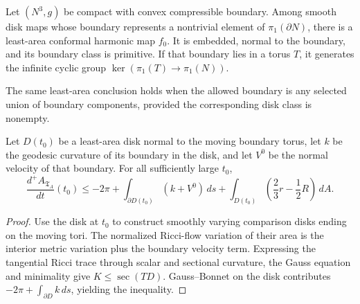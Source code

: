 \begin{theorem}
\label{thm:chow-iv-meeks-yau}
Let \((N^3,g)\) be compact with convex compressible boundary.  Among smooth
disk maps whose boundary represents a nontrivial element of
\(\pi_1(\partial N)\), there is a least-area conformal harmonic map \(f_0\).
It is embedded, normal to the boundary, and its boundary class is primitive.
If that boundary lies in a torus \(T\), it generates the infinite cyclic group
\(\ker(\pi_1(T)\to\pi_1(N))\).
\end{theorem}

\begin{remark}
\label{rem:chow-iv-relative-meeks-yau}
The same least-area conclusion holds when the allowed boundary is any selected
union of boundary components, provided the corresponding disk class is
nonempty.
\end{remark}

\begin{lemma}
\label{lem:chow-iv-minimizing-disk-first-variation}
Let \(D(t_0)\) be a least-area disk normal to the moving boundary torus, let
\(k\) be the geodesic curvature of its boundary in the disk, and let \(V^0\)
be the normal velocity of that boundary.  For all sufficiently large \(t_0\),
\[
 \frac{d^+A_{\mathfrak T_A}}{dt}(t_0)\le -2\pi
 +\int_{\partial D(t_0)}(k+V^0)\,ds
 +\int_{D(t_0)}\left(\frac23r-\frac12R\right)\,dA.
\]
\end{lemma}

\begin{proof}
Use the disk at \(t_0\) to construct smoothly varying comparison disks ending
on the moving tori.  The normalized Ricci-flow variation of their area is the
interior metric variation plus the boundary velocity term.  Expressing the
tangential Ricci trace through scalar and sectional curvature, the Gauss
equation and minimality give \(K\le\operatorname{sec}(TD)\).  Gauss--Bonnet on
the disk contributes \(-2\pi+\int_{\partial D}k\,ds\), yielding the inequality.
\end{proof}

